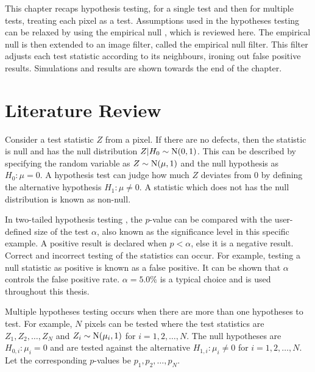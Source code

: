 This chapter recaps hypothesis testing, for a single test and then for multiple tests, treating each pixel as a test. Assumptions used in the hypotheses testing can be relaxed by using the empirical null \citep{efron2004large}, which is reviewed here. The empirical null is then extended to an image filter, called the empirical null filter. This filter adjusts each test statistic according to its neighbours, ironing out false positive results. Simulations and results are shown towards the end of the chapter.

\section{Literature Review}

Consider a test statistic $Z$ from a pixel. If there are no defects, then the statistic is null and has the null distribution $Z|H_0\sim\operatorname{N}(0,1)$. This can be described by specifying the random variable as $Z\sim\operatorname{N}(\mu,1)$ and the null hypothesis as $H_0:\mu=0$. A hypothesis test can judge how much $Z$ deviates from 0 by defining the alternative hypothesis $H_1:\mu\neq 0$. A statistic which does not has the null distribution is known as non-null.

In two-tailed hypothesis testing \citep{pearson1900on, neyman1933on, fisher1970statistical}, the $p$-value can be compared with the user-defined size of the test $\alpha$, also known as the significance level in this specific example. A positive result is declared when $p<\alpha$, else it is a negative result. Correct and incorrect testing of the statistics can occur. For example, testing a null statistic as positive is known as a false positive. It can be shown that $\alpha$ controls the false positive rate. $\alpha=5.0\%$ is a typical choice \citep{wasserstein2019moving} and is used throughout this thesis.

Multiple hypotheses testing occurs when there are more than one hypotheses to test. For example, $N$ pixels can be tested where the test statistics are $Z_1, Z_2, \dotsc, Z_N$ and $Z_i\sim\operatorname{N}(\mu_i,1)$ for $i=1,2,\dotsc,N$. The null hypotheses are $H_{0,i}:\mu_i=0$ and are tested against the alternative $H_{1,i}:\mu_i\neq 0$ for $i=1,2,\dotsc,N$. Let the corresponding $p$-values be $p_1, p_2, \dotsc, p_N$.


